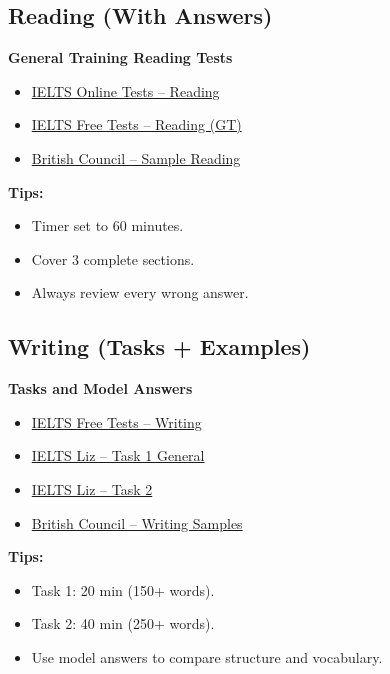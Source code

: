 \subsection{Reading  (With Answers)}

\textbf{General Training Reading Tests}
\begin{itemize}
    \item \href{https://ieltsonlinetests.com/ielts-reading-tests}{IELTS Online Tests – Reading}
    \item \href{https://www.ieltsfreetests.com/reading}{IELTS Free Tests – Reading (GT)}
    \item \href{https://takeielts.britishcouncil.org/take-ielts/prepare/free-ielts-english-practice-tests/reading}{British Council – Sample Reading}
\end{itemize}

\noindent\textbf{Tips:}
\begin{itemize}
    \item Timer set to 60 minutes.
    \item Cover 3 complete sections.
    \item Always review every wrong answer.
\end{itemize}

\subsection{Writing  (Tasks + Examples)}

\textbf{Tasks and Model Answers}
\begin{itemize}
    \item \href{https://www.ieltsfreetests.com/writing}{IELTS Free Tests – Writing}
    \item \href{https://ieltsliz.com/ielts-writing-task-1-general/}{IELTS Liz – Task 1 General}
    \item \href{https://ieltsliz.com/ielts-writing-task-2/}{IELTS Liz – Task 2}
    \item \href{https://takeielts.britishcouncil.org/take-ielts/prepare/free-ielts-english-practice-tests/writing}{British Council – Writing Samples}
\end{itemize}

\noindent\textbf{Tips:}
\begin{itemize}
    \item Task 1: 20 min (150+ words).
    \item Task 2: 40 min (250+ words).
    \item Use model answers to compare structure and vocabulary.
\end{itemize}

